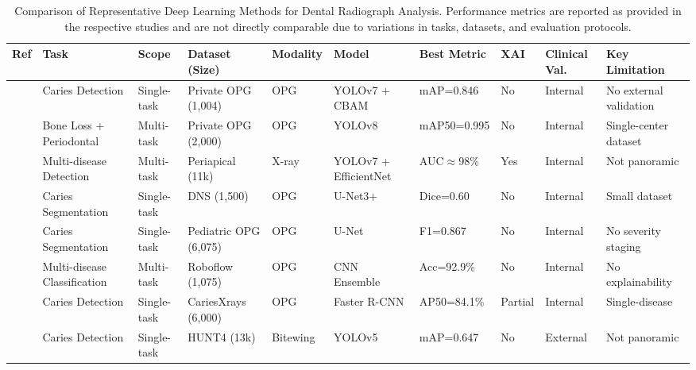 \documentclass[conference]{IEEEtran}
\begin{document}
\begin{table}[t]
\renewcommand{\arraystretch}{1.4}
\caption{Comparison of Representative Deep Learning Methods for Dental
Radiograph Analysis. Performance metrics are reported as provided in
the respective studies and are not directly comparable due to variations
in tasks, datasets, and evaluation protocols.}
\label{tab:comparison}
\centering
\scriptsize
\setlength{\tabcolsep}{3pt}
\begin{tabular}{p{0.5cm} p{2.0cm} p{1.3cm} p{2.2cm} p{1.1cm} p{2.4cm} p{1.6cm} p{0.6cm} p{1.3cm} p{2.2cm}}
\toprule
\textbf{Ref} & \textbf{Task} & \textbf{Scope} &
\textbf{Dataset (Size)} & \textbf{Modality} & \textbf{Model} &
\textbf{Best Metric} & \textbf{XAI} &
\textbf{Clinical Val.} & \textbf{Key Limitation} \\
\midrule
\cite{ayhan2025detection}        & Caries Detection             & Single-task & Private OPG (1,004)             & OPG      & YOLOv7 + CBAM           & mAP=0.846        & No      & Internal & No external validation \\
\cite{jundaeng2025advanced}      & Bone Loss + Periodontal      & Multi-task  & Private OPG (2,000)             & OPG      & YOLOv8                  & mAP50=0.995      & No      & Internal & Single-center dataset \\
\cite{chen2023deep}              & Multi-disease Detection      & Multi-task  & Periapical (11k)                & X-ray    & YOLOv7 + EfficientNet   & AUC$\approx$98\% & Yes     & Internal & Not panoramic \\
\cite{alharbi2023detection}      & Caries Segmentation          & Single-task & DNS (1,500)                     & OPG      & U-Net3+                 & Dice=0.60        & No      & Internal & Small dataset \\
\cite{asci2024deep}              & Caries Segmentation          & Single-task & Pediatric OPG (6,075)           & OPG      & U-Net                   & F1=0.867         & No      & Internal & No severity staging \\
\cite{gamal2025automated}        & Multi-disease Classification & Multi-task  & Roboflow (1,075)                & OPG      & CNN Ensemble            & Acc=92.9\%       & No      & Internal & No explainability \\
\cite{chen2024cariesxrays}       & Caries Detection             & Single-task & CariesXrays (6,000)             & OPG      & Faster R-CNN            & AP50=84.1\%      & Partial & Internal & Single-disease \\
\cite{perez2024ai}               & Caries Detection             & Single-task & HUNT4 (13k)                     & Bitewing & YOLOv5                  & mAP=0.647        & No      & External & Not panoramic \\

\end{tabular}
\end{table}
\end{document}
